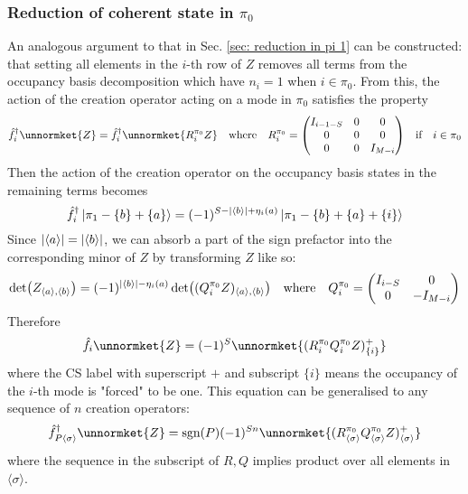 \documentclass[12pt]{article}
\newcommand{\sgn}{\text{sgn}}
\newcommand{\seq}[1]{\langle #1\rangle}
\newcommand{\hc}{^\dagger}
\begin{document}
	\subsubsection{Reduction of coherent state in $\pi_0$}
	An analogous argument to that in Sec. \ref{sec: reduction in pi 1} can be constructed: that setting all elements in the $i$-th row of $Z$ removes all terms from the occupancy basis decomposition which have $n_i=1$ when $i\in\pi_0$. From this, the action of the creation operator acting on a mode in $\pi_0$ satisfies the property
	\begin{equation}
	\hat{f}\hc_i\unnormket{Z}=\hat{f}\hc_i\unnormket{R^{\pi_0}_iZ}\qq{where}R^{\pi_0}_i=\mqty(\dmat[0]{I_{i-1-S}, 0, I_{M-i}})\qq{if}i\in\pi_0
	\end{equation}
	Then the action of the creation operator on the occupancy basis states in the remaining terms becomes
	\begin{equation}
	\hat{f}\hc_i\ket{\pi_1-\{b\}+\{a\}}=(-1)^{S-\abs{\seq{b}}+\eta_i(a)}\ket{\pi_1-\{b\}+\{a\}+\{i\}}
	\end{equation}
	Since $\abs{\seq{a}}=\abs{\seq{b}}$, we can absorb a part of the sign prefactor into the corresponding minor of $Z$ by transforming $Z$ like so:
	\begin{equation}
	\det(Z_{\seq{a},\seq{b}})=(-1)^{\abs{\seq{b}}-\eta_i(a)}\det((Q^{\pi_0}_iZ)_{\seq{a},\seq{b}})\qq{where}Q^{\pi_0}_i=\mqty(\dmat[0]{I_{i-S}, -I_{M-i}})
	\end{equation}
	Therefore
	\begin{equation}
	\hat{f}_i\unnormket{Z}=(-1)^{S}\unnormket{(R^{\pi_0}_iQ^{\pi_0}_iZ)^+_{\{i\}}}
	\end{equation}
	where the CS label with superscript $+$ and subscript $\{i\}$ means the occupancy of the $i$-th mode is "forced" to be one. This equation can be generalised to any sequence of $n$ creation operators:
	\begin{equation}
	\hat{f}\hc_{P\seq{\sigma}}\unnormket{Z}=\sgn(P)(-1)^{Sn}\unnormket{(R^{\pi_0}_{\seq{\sigma}}Q^{\pi_0}_{\seq{\sigma}}Z)^{+}_{\seq{\sigma}}}
	\end{equation}
	where the sequence in the subscript of $R, Q$ implies product over all elements in $\seq{\sigma}$.
	
\end{document}

